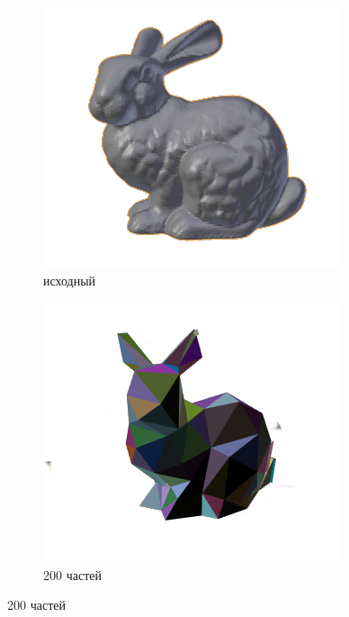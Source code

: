 \documentclass[11pt,a4paper]{extarticle}
\begin{document}
		\newpage
		\begin{figure}[ht]
			\centering
			\begin{subfigure}{2in}
				\includegraphics[width=\textwidth]{bunny}					
				\caption{исходный}
				\label{bunny1}					
			\end{subfigure}
			\begin{subfigure}{2in}
				\includegraphics[width=\textwidth]{bunny_hacd200}					
				\caption{200 частей}
				\label{bunny2}					

\end{subfigure}
\end{figure}
\end{document}
